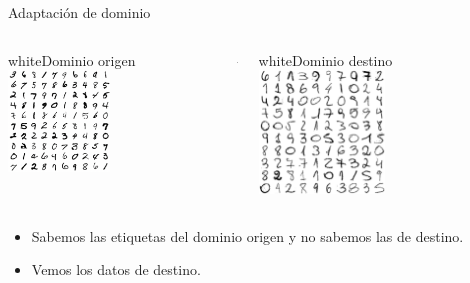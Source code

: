 \documentclass{beamer}
\begin{document}
\begin{frame}{Adaptación de dominio}
      \begin{columns}
            \begin{column}{0.4\textwidth}
                  \begin{colorblock}[black]{white}{Dominio origen}
                        \centering
                        \includegraphics[width=0.5\textwidth]{images/marco-teorico/mnist.png}
                  \end{colorblock}
            \end{column}
            \begin{column}{0.15\textwidth}
                  \centering
                  $\nLeftrightarrow$
            \end{column}
            \begin{column}{0.4\textwidth}
                  \begin{colorblock}[black]{white}{Dominio destino}
                        \centering
                        \includegraphics[width=0.5\textwidth]{images/marco-teorico/tds.png}
                  \end{colorblock}
            \end{column}
      \end{columns}
      \vfill
      \begin{itemize}
            \item Sabemos las etiquetas del dominio origen y no sabemos las de destino.
            \item Vemos los datos de destino.
      \end{itemize}
\end{frame}
\end{document}
